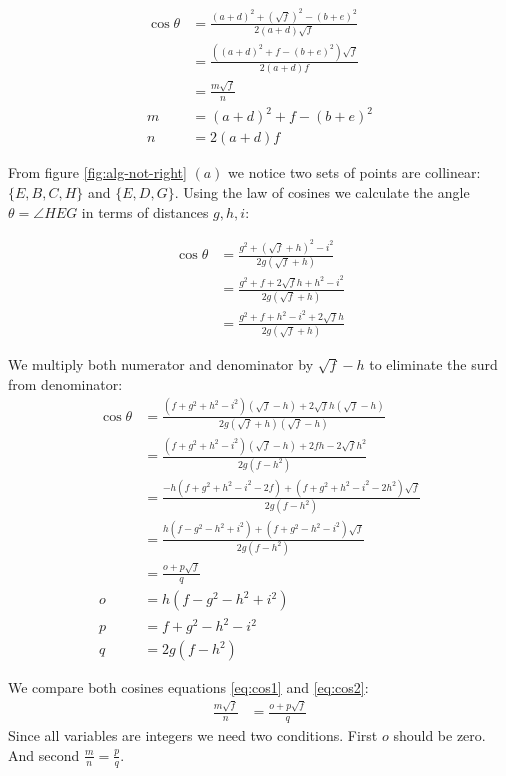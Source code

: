 \documentclass[11pt]{article}
\begin{document}
\begin{align}
\cos\theta &= \frac{(a+d)^2 + (\sqrt{f})^2 - (b+e)^2}{2(a+d)\sqrt{f}} \nonumber\\
 &= \frac{((a+d)^2 + f - (b+e)^2)\sqrt{f}}{2(a+d)f} \\
 &= \frac{m\sqrt{f}}{n} \label{eq:cos1}\\
 m &= (a+d)^2 + f - (b+e)^2 \\
 n &= 2(a+d)f
\end{align}

From figure \ref{fig:alg-not-right} $(a)$ we notice two sets of points are collinear:
$\{ E,B,C,H \}$ and $\{ E,D,G \}$. Using the law of cosines we calculate the 
angle $\theta = \angle{HEG}$ in terms of distances $g,h,i$:

\begin{align}
\cos\theta &= \frac{g^2 + (\sqrt{f}+h)^2 - i^2}{2g(\sqrt{f}+h)} \nonumber\\
 &= \frac{g^2 + f + 2\sqrt{f}h + h^2 - i^2}{2g(\sqrt{f}+h)} \nonumber\\
 &= \frac{g^2 + f + h^2 - i^2+ 2\sqrt{f}h}{2g(\sqrt{f}+h)}
\end{align}

We multiply both numerator and denominator by $\sqrt{f}-h$ to eliminate the surd from denominator:
\begin{align}
\cos\theta &= \frac{(f + g^2 + h^2 - i^2)(\sqrt{f}-h) + 2\sqrt{f}h(\sqrt{f}-h)}
	{2g(\sqrt{f}+h)(\sqrt{f}-h)} \nonumber\\
 &= \frac{(f + g^2 + h^2 - i^2)(\sqrt{f}-h) + 2fh - 2\sqrt{f}h^2}
	{2g(f-h^2)} \nonumber\\ 
 &= \frac{-h(f + g^2 + h^2 - i^2 - 2f) + (f + g^2 + h^2 - i^2 - 2h^2)\sqrt{f}}
	{2g(f-h^2)} \nonumber\\ 
 &= \frac{h(f - g^2 - h^2 + i^2) + (f + g^2 - h^2 - i^2)\sqrt{f}}
	{2g(f-h^2)} \nonumber\\ 
 &= \frac{o + p\sqrt{f}}{q} \label{eq:cos2}\\
o &= h(f - g^2 - h^2 + i^2) \\
p &= f + g^2 - h^2 - i^2 \\
q &= 2g(f-h^2)
\end{align}

We compare both cosines equations \ref{eq:cos1} and \ref{eq:cos2}:
\begin{align}
\frac{m\sqrt{f}}{n} &= \frac{o + p\sqrt{f}}{q}
\end{align}
Since all variables are integers we need two conditions. First $o$ should be zero.
And second $\frac{m}{n} = \frac{p}{q}$.
\end{document}
